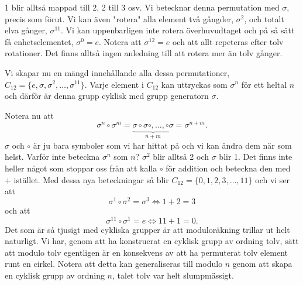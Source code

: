 \documentclass{article}
\theoremstyle{definition}
\begin{document}
\begin{center}
\end{center}
1 blir alltså mappad till 2, 2 till 3 osv. Vi betecknar denna permutation med $\sigma$,
precis som förut. Vi kan även "rotera" alla element två gångder, $\sigma^2$,
och totalt elva gånger, $\sigma^{11}$. Vi kan uppenbarligen inte rotera överhuvudtaget 
och på så sätt få enhetselementet, $\sigma^0 = e.$
Notera att $\sigma^{12} = e$ och att allt repeteras efter tolv rotationer. 
Det finns alltså ingen anledning till att rotera mer än tolv gånger.

Vi skapar nu en mängd innehållande alla dessa permutationer, 
\linebreak
$C_{12} = \{e, \sigma, \sigma^2, \ldots, \sigma^{11}\}$. Varje element i $C_{12}$ kan
uttryckas som $\sigma^n$ för ett heltal $n$ och därför är denna grupp cyklisk med grupp generatorn $\sigma$.

Notera nu att 
\[\sigma^n \circ \sigma^m = 
\underbrace{\sigma \circ \sigma \circ, \ldots, \circ \sigma}_{\text{$n + m$}} = \sigma^{n+m}.\]
$\sigma$ och $\circ$ är ju bara symboler som vi har hittat på och vi kan ändra dem när som helst. 
Varför inte beteckna $\sigma^n$ som $n$? $\sigma^2$ blir alltså 2 och $\sigma$ blir 1. 
Det finns inte heller något som stoppar oss från att kalla $\circ$ för addition och beteckna den 
med $+$ istället. Med dessa nya beteckningar så blir
$C_{12} = \{0, 1, 2, 3, \ldots, 11\}$ 
och vi ser att
\[\sigma^1 \circ \sigma^2 = \sigma^3 \iff 1 + 2 = 3\]
och att 
\[\sigma^{11} \circ \sigma^1 = e \iff 11 + 1 = 0.\]
Det som är så tjusigt med cykliska grupper är att moduloräkning trillar ut helt naturligt. 
Vi har, genom att ha konstruerat en cyklisk grupp av ordning tolv, 
sätt att modulo tolv egentligen är en konsekvens av 
att ha permuterat tolv element runt en cirkel. Notera att detta kan generaliseras till 
modulo $n$ genom att skapa en cyklisk grupp av ordning $n$, talet tolv var helt slumpmässigt.
\end{document}
